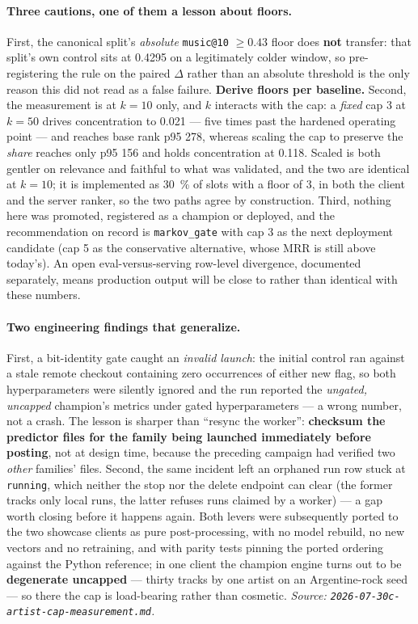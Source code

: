 \documentclass[11pt]{article}
\begin{document}
\paragraph{Three cautions, one of them a lesson about floors.} First, the canonical
split's \emph{absolute} \texttt{music@10} $\ge\num{0.43}$ floor does \textbf{not}
transfer: that split's own control sits at \num{0.4295} on a legitimately colder
window, so pre-registering the rule on the paired $\Delta$ rather than an absolute
threshold is the only reason this did not read as a false failure. \textbf{Derive
floors per baseline.} Second, the measurement is at $k=\num{10}$ only, and $k$
interacts with the cap: a \emph{fixed} cap 3 at $k=\num{50}$ drives concentration
to \num{0.021} --- five times past the hardened operating point --- and reaches base
rank p95 \num{278}, whereas scaling the cap to preserve the \emph{share} reaches
only p95 \num{156} and holds concentration at \num{0.118}. Scaled is both gentler
on relevance and faithful to what was validated, and the two are identical at
$k=\num{10}$; it is implemented as \SI{30}{\percent} of slots with a floor of 3, in
both the client and the server ranker, so the two paths agree by construction.
Third, nothing here was promoted, registered as a champion or deployed, and the
recommendation on record is \texttt{markov\_gate} with cap 3 as the next deployment
candidate (cap 5 as the conservative alternative, whose MRR is still above today's).
An open eval-versus-serving row-level divergence, documented separately, means
production output will be close to rather than identical with these numbers.

\paragraph{Two engineering findings that generalize.} First, a bit-identity gate
caught an \emph{invalid launch}: the initial control ran against a stale remote
checkout containing zero occurrences of either new flag, so both hyperparameters
were silently ignored and the run reported the \emph{ungated, uncapped} champion's
metrics under gated hyperparameters --- a wrong number, not a crash. The lesson is
sharper than ``resync the worker'': \textbf{checksum the predictor files for the
family being launched immediately before posting}, not at design time, because the
preceding campaign had verified two \emph{other} families' files. Second, the same
incident left an orphaned run row stuck at \texttt{running}, which neither the stop
nor the delete endpoint can clear (the former tracks only local runs, the latter
refuses runs claimed by a worker) --- a gap worth closing before it happens again.
Both levers were subsequently ported to the two showcase clients as pure
post-processing, with no model rebuild, no new vectors and no retraining, and with
parity tests pinning the ported ordering against the Python reference; in one client
the champion engine turns out to be \textbf{degenerate uncapped} --- thirty tracks by
one artist on an Argentine-rock seed --- so there the cap is load-bearing rather
than cosmetic.
\emph{Source: \texttt{2026-07-30c-artist-cap-measurement.md}.}
\end{document}
